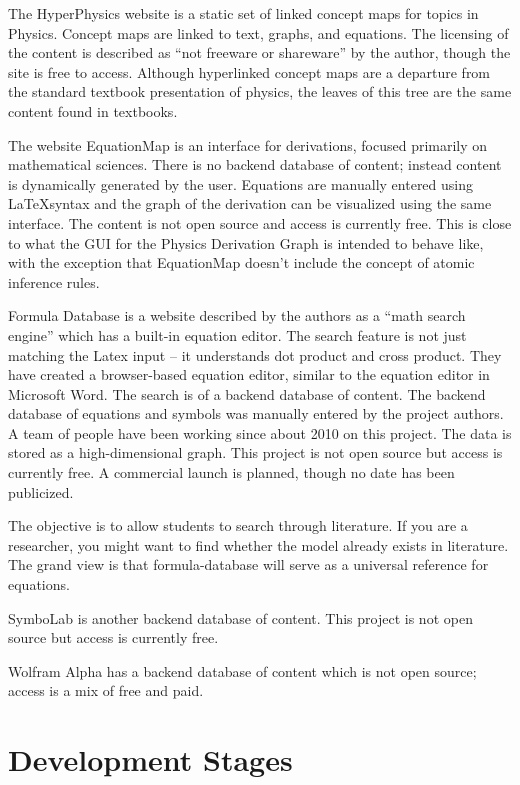 \documentclass{article}
\begin{document}
\begin{multicols}{2}
The HyperPhysics website\cite{2015_Hyperphysics} is a static set of linked concept maps for topics in Physics. Concept maps are linked to text, graphs, and equations. The licensing of the content is described as ``not freeware or shareware'' by the author, though the site is free to access. Although hyperlinked concept maps are a departure from the standard textbook presentation of physics, the leaves of this tree are the same content found in textbooks. 

The website EquationMap\cite{2015_EquationMap} is an interface for derivations, focused primarily on mathematical sciences. There is no backend database of content; instead content is dynamically generated by the user. Equations are manually entered using \LaTeX syntax and the graph of the derivation can be visualized using the same interface. The content is not open source and access is currently free. This is close to what the GUI for the Physics Derivation Graph is intended to behave like, with the exception that EquationMap doesn't include the concept of atomic inference rules.


Formula Database\cite{2015_FormulaDatabase} is a website described by the authors as a ``math search engine'' which has a built-in equation editor. The search feature is not just matching the Latex input -- it understands dot product and cross product. They have created a browser-based equation editor, similar to the equation editor in Microsoft Word. The search is of a backend database of content. The backend database of equations and symbols was manually entered by the project authors. A team of people have been working since about 2010 on this project. The data is stored as a high-dimensional graph. This project is not open source but access is currently free. A commercial launch is planned, though no date has been publicized. 

The objective is to allow students to search through literature. If you are a researcher, you might want to find whether the model already exists in literature. The grand view is that formula-database will serve as a universal reference for equations.


SymboLab\cite{2015_Symbolab} is another backend database of content. This project is not open source but access is currently free. 

Wolfram Alpha\cite{2015_WolframAlpha} has a backend database of content which is not open source; access is a mix of free and paid. 

\section{Development Stages\label{sec:stages}}


\end{multicols}
\end{document}
